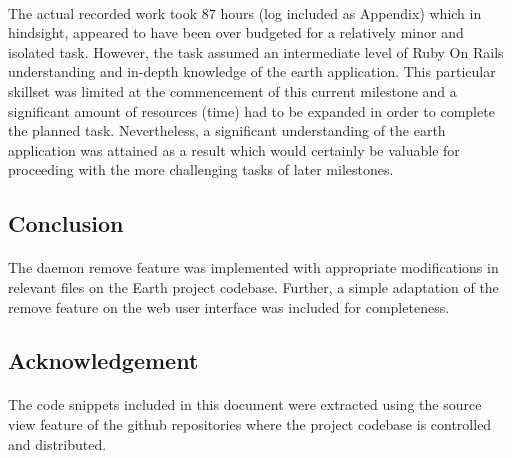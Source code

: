 \documentclass[10pt,a4,oneside]{article}
\begin{document}
\paragraph{}
The actual recorded work took 87 hours (log included as Appendix) which in 
hindsight, appeared to have been over budgeted for a relatively minor and 
isolated task. However, the task assumed an intermediate level of Ruby On Rails 
understanding and in-depth knowledge of the earth application. 
This particular skillset was limited at the commencement of this current 
milestone and a significant amount of resources (time) had to be expanded 
in order to complete the planned task. Nevertheless, a significant 
understanding of the earth application was attained as a result which 
would certainly be valuable for proceeding with the more challenging 
tasks of later milestones.

\paragraph{}

\subsection*{Conclusion}

\paragraph{}
The daemon remove feature was implemented with appropriate modifications 
in relevant files on the Earth project codebase. Further, a simple 
adaptation of the remove feature on the web user interface was included 
for completeness.

\paragraph{}

\subsection*{Acknowledgement}


\paragraph{}
The code snippets included in this document were extracted using the 
source view feature of the github repositories where the project 
codebase is controlled and distributed.
\end{document}
